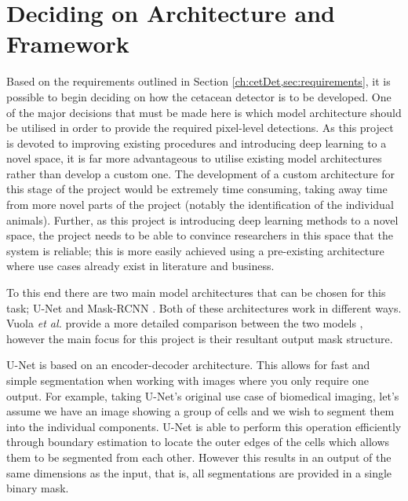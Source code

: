 \section{Deciding on Architecture and Framework}\label{ch:cetDet,sec:deciding}

Based on the requirements outlined in Section \ref{ch:cetDet,sec:requirements}, it is possible to begin deciding on how the cetacean detector is to be developed. One of the major decisions that must be made here is which model architecture should be utilised in order to provide the required pixel-level detections. As this project is devoted to improving existing procedures and introducing deep learning to a novel space, it is far more advantageous to utilise existing model architectures rather than develop a custom one. The development of a custom architecture for this stage of the project would be extremely time consuming, taking away time from more novel parts of the project (notably the identification of the individual animals). Further, as this project is introducing deep learning methods to a novel space, the project needs to be able to convince researchers in this space that the system is reliable; this is more easily achieved using a pre-existing architecture where use cases already exist in literature and business. 

To this end there are two main model architectures that can be chosen for this task; U-Net \cite{ronneberger_u-net_2015} and Mask-RCNN \cite{he_mask_2017}. Both of these architectures work in different ways. Vuola \textit{et al.} provide a more detailed comparison between the two models \cite{vuola_mask-rcnn_2019}, however the main focus for this project is their resultant output mask structure. 

U-Net is based on an encoder-decoder architecture. This allows for fast and simple segmentation when working with images where you only require one output. For example, taking U-Net's original use case of biomedical imaging, let's assume we have an image showing a group of cells and we wish to segment them into the individual components. U-Net is able to perform this operation efficiently through boundary estimation to locate the outer edges of the cells which allows them to be segmented from each other. However this results in an output of the same dimensions as the input, that is, all segmentations are provided in a single binary mask. 

